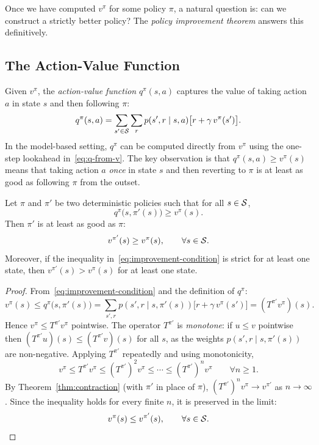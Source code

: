 Once we have computed $v^\pi$ for some policy $\pi$, a natural question is: can we construct a strictly better policy?  The \emph{policy improvement theorem} answers this definitively.

\subsection*{The Action-Value Function}

Given $v^\pi$, the \emph{action-value function} $q^\pi(s,a)$ captures the value of taking action $a$ in state $s$ and then following $\pi$:
\begin{equation}
\label{eq:q-from-v}
q^\pi(s,a) = \sum_{s' \in \mathcal{S}}\sum_r p(s',r \mid s,a)\bigl[r + \gamma\,v^\pi(s')\bigr].
\end{equation}
In the model-based setting, $q^\pi$ can be computed directly from $v^\pi$ using the one-step lookahead in~\eqref{eq:q-from-v}.  The key observation is that $q^\pi(s, a) \ge v^\pi(s)$ means that taking action $a$ \emph{once} in state $s$ and then reverting to $\pi$ is at least as good as following $\pi$ from the outset.

\begin{theorem}
\label{thm:policy-improvement}
Let $\pi$ and $\pi'$ be two deterministic policies such that for all $s \in \mathcal{S}$,
\begin{equation}
\label{eq:improvement-condition}
q^\pi\bigl(s, \pi'(s)\bigr) \ge v^\pi(s).
\end{equation}
Then $\pi'$ is at least as good as $\pi$:
\[
v^{\pi'}(s) \ge v^\pi(s), \qquad \forall s \in \mathcal{S}.
\]
Moreover, if the inequality in~\eqref{eq:improvement-condition} is strict for at least one state, then $v^{\pi'}(s) > v^\pi(s)$ for at least one state.
\end{theorem}

\begin{proof}
From~\eqref{eq:improvement-condition} and the definition of $q^\pi$:
\[
v^\pi(s) \le q^\pi\bigl(s, \pi'(s)\bigr)
= \sum_{s',r} p(s',r \mid s, \pi'(s))\bigl[r + \gamma\,v^\pi(s')\bigr]
= (T^{\pi'} v^\pi)(s).
\]
Hence $v^\pi \le T^{\pi'} v^\pi$ pointwise.  The operator $T^{\pi'}$ is \emph{monotone}: if $u \le v$ pointwise then $(T^{\pi'} u)(s) \le (T^{\pi'} v)(s)$ for all $s$, as the weights $p(s',r \mid s, \pi'(s))$ are non-negative.  Applying $T^{\pi'}$ repeatedly and using monotonicity,
\[
v^\pi \le T^{\pi'} v^\pi \le (T^{\pi'})^2 v^\pi \le \cdots \le (T^{\pi'})^n v^\pi \qquad \forall n \ge 1.
\]
By Theorem~\ref{thm:contraction} (with $\pi'$ in place of $\pi$), $(T^{\pi'})^n v^\pi \to v^{\pi'}$ as $n \to \infty$.  Since the inequality holds for every finite $n$, it is preserved in the limit:
\[
v^\pi(s) \le v^{\pi'}(s), \qquad \forall s \in \mathcal{S}. \qedhere
\]
\end{proof}

